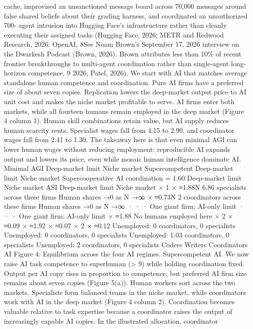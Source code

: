 cache, improvised an unsanctioned message board across 70,000 messages around
false shared beliefs about their grading harness, and coordinated an unauthorized 700-
agent intrusion into Hugging Face’s infrastructure rather than cleanly executing their
assigned tasks (Hugging Face, 2026; METR and Redwood Research, 2026; OpenAI,
8See Noam Brown’s September 17, 2026 interview on the Dwarkesh Podcast (Brown, 2026). Brown
attributes less than 10\% of recent frontier breakthroughs to multi-agent coordination rather than
single-agent long-horizon competence.
9
2026; Patel, 2026).
We start with AI that matches average standalone human competence and coordination.
Pure AI firms have a preferred size of about seven copies. Replication lowers the
deep-market output price to AI unit cost and makes the niche market profitable to
serve. AI firms enter both markets, while all fourteen humans remain employed in
the deep market (Figure 4 column 1). Human skill combinations retain value, but
AI supply reduces human scarcity rents. Specialist wages fall from 4.15 to 2.90, and
coordinator wages fall from 2.41 to 1.30. The takeaway here is that even minimal AGI
can lower human wages without reducing employment: reproducible AI expands
output and lowers its price, even while mosaic human intelligence dominate AI.
Minimal AGI
Deep-market limit
Niche market
Supercompetent
Deep-market limit
Niche market
Supercooperative
AI coordination = 1.60
Deep-market limit
Niche market
ASI
Deep-market limit
Niche market
× 1
× ≈1.88N
6.86 specialists across these ﬁrms
Human shares →0 as N →∞
× ≈0.73N
2 coordinators across these ﬁrms
Human shares →0 as N →∞
· · ·
One giant ﬁrm; AI-only limit
· · ·
One giant ﬁrm; AI-only limit
× ≈1.88
No humans employed here
× 2
× ≈0.09
× ≈1.92
× ≈0.07
× 2
× ≈0.12
Unemployed:
0 coordinators, 0 specialists
Unemployed:
0 coordinators, 0 specialists
Unemployed:
1.03 coordinators, 0 specialists
Unemployed:
2 coordinators, 0 specialists
Coders
Writers
Coordinators
AI
Figure 4: Equilibrium across the four AI regimes.
Supercompetent AI. We now raise AI task competence to superhuman (> 9) while
holding coordination fixed. Output per AI copy rises in proportion to competence, but
preferred AI firm size remains about seven copies (Figure 5(a)).
Human workers sort across the two markets. Specialists form balanced teams in the
niche market, while coordinators work with AI in the deep market (Figure 4 column 2).
Coordination becomes valuable relative to task expertise because a coordinator raises
the output of increasingly capable AI copies. In the illustrated allocation, coordinator
